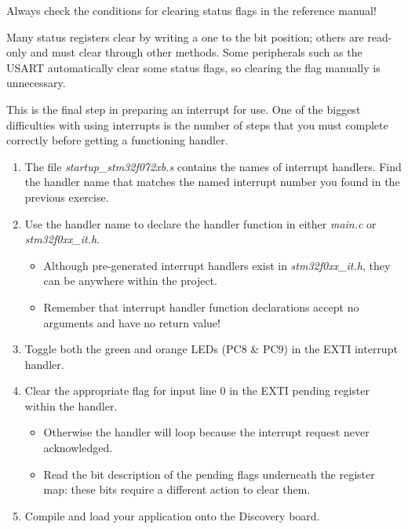 \documentclass[openany,11pt,fleqn]{book} %
\begin{document}
\begin{warning}
    Always check the conditions for clearing status flags in the reference manual!
    
    Many status registers clear by writing a one to the bit position; others are read-only and must clear through other methods. Some peripherals such as the USART automatically clear some status flags, so clearing the flag manually is unnecessary.
\end{warning}

\begin{exercise}
    \label{ex5}
    This is the final step in preparing an interrupt for use. One of the biggest difficulties with using interrupts is the number of steps that you must complete correctly before getting a functioning handler.
    
    \begin{enumerate}
        \item The file \textit{startup\_stm32f072xb.s} contains the names of interrupt handlers. Find the handler name that matches the named interrupt number you found in the previous exercise. 
        \item Use the handler name to declare the handler function in either \textit{main.c} or \textit{stm32f0xx\_it.h}.
        \begin{itemize}
            \item Although pre-generated interrupt handlers exist in \textit{stm32f0xx\_it.h}, they can be anywhere within the project. 
            \item Remember that interrupt handler function declarations accept no arguments and have no return value! 
        \end{itemize}
        \item Toggle both the green and orange LEDs (PC8 \& PC9) in the EXTI interrupt handler. 
        \item Clear the appropriate flag for input line 0 in the EXTI pending register within the handler.
        \begin{itemize}
            \item Otherwise the handler will loop because the interrupt request never acknowledged.
            \item Read the bit description of the pending flags underneath the register map: these bits require a different action to clear them.
        \end{itemize}
        \item Compile and load your application onto the Discovery board.
    \end{enumerate}
    

\end{exercise}
\end{document}
